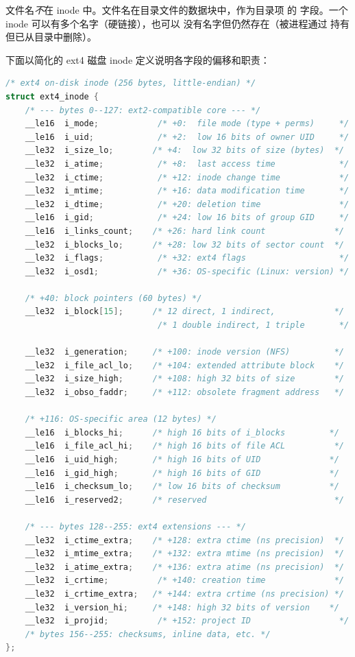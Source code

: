 \begin{filesystemlayout}
文件名\emph{不}在 inode 中。文件名在目录文件的数据块中，作为目录项
的  字段。一个 inode 可以有多个名字（硬链接），也可以
没有名字但仍然存在（被进程通过  持有但已从目录中删除）。


下面以简化的 ext4 磁盘 inode 定义说明各字段的偏移和职责：

\begin{lstlisting}[language=C]
/* ext4 on-disk inode (256 bytes, little-endian) */
struct ext4_inode {
    /* --- bytes 0--127: ext2-compatible core --- */
    __le16  i_mode;            /* +0:  file mode (type + perms)     */
    __le16  i_uid;             /* +2:  low 16 bits of owner UID     */
    __le32  i_size_lo;        /* +4:  low 32 bits of size (bytes)  */
    __le32  i_atime;           /* +8:  last access time             */
    __le32  i_ctime;           /* +12: inode change time            */
    __le32  i_mtime;           /* +16: data modification time       */
    __le32  i_dtime;           /* +20: deletion time                */
    __le16  i_gid;             /* +24: low 16 bits of group GID     */
    __le16  i_links_count;    /* +26: hard link count              */
    __le32  i_blocks_lo;      /* +28: low 32 bits of sector count  */
    __le32  i_flags;           /* +32: ext4 flags                   */
    __le32  i_osd1;            /* +36: OS-specific (Linux: version) */

    /* +40: block pointers (60 bytes) */
    __le32  i_block[15];      /* 12 direct, 1 indirect,            */
                               /* 1 double indirect, 1 triple       */

    __le32  i_generation;     /* +100: inode version (NFS)         */
    __le32  i_file_acl_lo;    /* +104: extended attribute block    */
    __le32  i_size_high;      /* +108: high 32 bits of size        */
    __le32  i_obso_faddr;     /* +112: obsolete fragment address   */

    /* +116: OS-specific area (12 bytes) */
    __le16  i_blocks_hi;      /* high 16 bits of i_blocks         */
    __le16  i_file_acl_hi;    /* high 16 bits of file ACL          */
    __le16  i_uid_high;       /* high 16 bits of UID              */
    __le16  i_gid_high;       /* high 16 bits of GID              */
    __le16  i_checksum_lo;    /* low 16 bits of checksum          */
    __le16  i_reserved2;      /* reserved                          */

    /* --- bytes 128--255: ext4 extensions --- */
    __le32  i_ctime_extra;    /* +128: extra ctime (ns precision)  */
    __le32  i_mtime_extra;    /* +132: extra mtime (ns precision)  */
    __le32  i_atime_extra;    /* +136: extra atime (ns precision)  */
    __le32  i_crtime;          /* +140: creation time              */
    __le32  i_crtime_extra;   /* +144: extra crtime (ns precision) */
    __le32  i_version_hi;     /* +148: high 32 bits of version    */
    __le32  i_projid;          /* +152: project ID                  */
    /* bytes 156--255: checksums, inline data, etc. */
};
\end{lstlisting}


\end{filesystemlayout}
